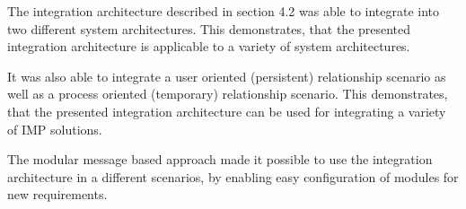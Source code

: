 The integration architecture described in section 4.2 was able to integrate into two different system architectures. This demonstrates, that the presented integration architecture is applicable to a variety of system architectures.

It was also able to integrate a user oriented (persistent) relationship scenario as well as a process oriented (temporary) relationship scenario. This demonstrates, that the presented integration architecture can be used for integrating a variety of IMP solutions.

The modular message based approach made it possible to use the integration architecture in a different scenarios, by enabling easy configuration of modules for new requirements.

